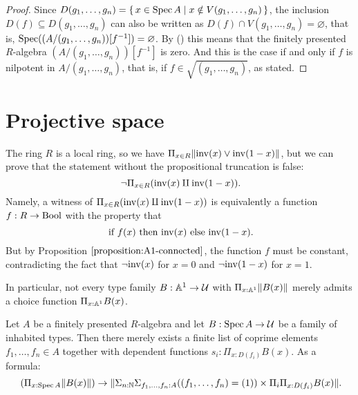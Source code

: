\documentclass{zariski}
\begin{document}
\begin{proof}
  Since $D(g_1, \dots, g_n) = \{\, x \in \operatorname{Spec} A \mid x \notin V(g_1, \dots, g_n) \,\}$,
  the inclusion $D(f) \subseteq D(g_1, \dots, g_n)$
  can also be written as
  $D(f) \cap V(g_1, \dots, g_n) = \varnothing$, that is,
  $\operatorname{Spec}((A/(g_1, \dots, g_n))[f^{-1}]) = \varnothing$.
  By ()
  this means that the finitely presented $R$-algebra $(A/(g_1, \dots, g_n))[f^{-1}]$
  is zero.
  And this is the case if and only if $f$ is nilpotent in $A/(g_1, \dots, g_n)$,
  that is, if $f \in \sqrt{(g_1, \dots, g_n)}$, as stated.
\end{proof}

\pagebreak

\section{Projective space}



\begin{example}
  The ring $R$ is a local ring, so we have
  $\Pi_{x \in R} \lVert \mathrm{inv}(x) \lor \mathrm{inv}(1 - x) \rVert$,
  but we can prove that
  the statement without the propositional truncation is false:
  \[ \lnot \Pi_{x \in R} (\inv(x) \amalg \inv(1 - x)) \rlap{.} \]
  Namely,
  a witness of $\Pi_{x \in R} (\mathrm{inv}(x) \amalg \mathrm{inv}(1 - x))$
  is equivalently a function $f : R \to \mathrm{Bool}$
  with the property that
  \[ \text{if $f(x)$ then $\inv(x)$ else $\inv(1 - x)$} \rlap{.} \]
  But by Proposition $\ref{proposition:A1-connected}$,
  the function $f$ must be constant,
  contradicting the fact that
  $\lnot\mathrm{inv}(x)$ for $x = 0$ and $\lnot\mathrm{inv}(1 - x)$ for $x = 1$.

  In particular,
  not every type family $B : \mathbb{A}^1 \to \mathcal{U}$ with $\Pi_{x : \mathbb{A}^1} \lVert B(x) \rVert$
  merely admits a choice function $\Pi_{x : \mathbb{A}^1} B(x)$.
\end{example}

\begin{axiom}[Z-choice]%
  \label{Z-choice}
  Let $A$ be a finitely presented $R$-algebra
  and let $B : \operatorname{Spec} A \to \mathcal{U}$ be a family of inhabited types.
  Then there merely exists
  a finite list of coprime elements $f_1, \dots, f_n \in A$
  together with dependent functions $s_i : \Pi_{x : D(f_i)} B(x)$.
  As a formula:
  \[ (\Pi_{x : \Spec A} \propTrunc{B(x)}) \to
     \propTrunc{ \Sigma_{n : \N} \Sigma_{f_1, \dots, f_n : A}
      ((f_1, \dots, f_n) = (1)) \times
      \Pi_i \Pi_{x : D(f_i)} B(x) }
     \rlap{.}
  \]
\end{axiom}
\end{document}
